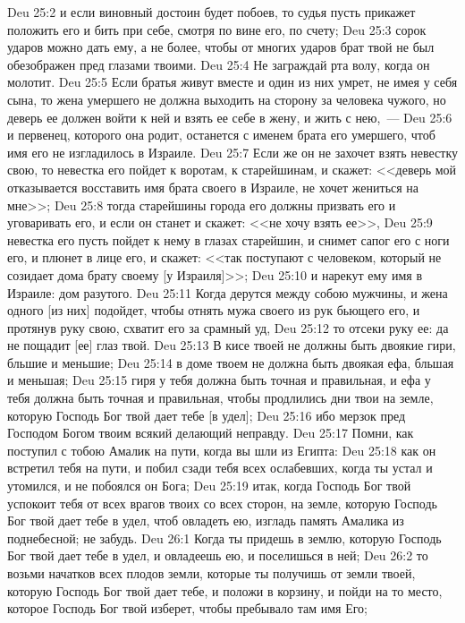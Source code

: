 \vs Deu 25:2 и если виновный достоин будет побоев, то судья пусть прикажет положить его и бить при себе, смотря по вине его, по счету;
\vs Deu 25:3 сорок ударов можно дать ему, а не более, чтобы от многих ударов брат твой не был обезображен пред глазами твоими.
\rsbpar\vs Deu 25:4 Не заграждай рта волу, когда он молотит.
\rsbpar\vs Deu 25:5 Если братья живут вместе и один из них умрет, не имея у себя сына, то жена умершего не должна выходить на сторону за человека чужого, но деверь ее должен войти к ней и взять ее себе в жену, и жить с нею,~---
\vs Deu 25:6 и первенец, которого она родит, останется с именем брата его умершего, чтоб имя его не изгладилось в Израиле.
\vs Deu 25:7 Если же он не захочет взять невестку свою, то невестка его пойдет к воротам, к старейшинам, и скажет: <<деверь мой отказывается восставить имя брата своего в Израиле, не хочет жениться на мне>>;
\vs Deu 25:8 тогда старейшины города его должны призвать его и уговаривать его, и если он станет и скажет: <<не хочу взять ее>>,
\vs Deu 25:9  невестка его пусть пойдет к нему в глазах старейшин, и снимет сапог его с ноги его, и плюнет в лице его, и скажет: <<так поступают с человеком, который не созидает дома брату своему [у Израиля]>>;
\vs Deu 25:10 и нарекут ему имя в Израиле: дом разутого.
\rsbpar\vs Deu 25:11 Когда дерутся между собою мужчины, и жена одного [из них] подойдет, чтобы отнять мужа своего из рук бьющего его, и протянув руку свою, схватит его за срамный уд,
\vs Deu 25:12 то отсеки руку ее: да не пощадит [ее] глаз твой.
\rsbpar\vs Deu 25:13 В кисе твоей не должны быть двоякие гири, бльшие и меньшие;
\vs Deu 25:14 в доме твоем не должна быть двоякая ефа, бльшая и меньшая;
\vs Deu 25:15 гиря у тебя должна быть точная и правильная, и ефа у тебя должна быть точная и правильная, чтобы продлились дни твои на земле, которую Господь Бог твой дает тебе [в удел];
\vs Deu 25:16 ибо мерзок пред Господом Богом твоим всякий делающий неправду.
\vs Deu 25:17 Помни, как поступил с тобою Амалик на пути, когда вы шли из Египта:
\vs Deu 25:18 как он встретил тебя на пути, и побил сзади тебя всех ослабевших, когда ты устал и утомился, и не побоялся он Бога;
\vs Deu 25:19 итак, когда Господь Бог твой успокоит тебя от всех врагов твоих со всех сторон, на земле, которую Господь Бог твой дает тебе в удел, чтоб овладеть ею, изгладь память Амалика из поднебесной; не забудь.
\vs Deu 26:1 Когда ты придешь в землю, которую Господь Бог твой дает тебе в удел, и овладеешь ею, и поселишься в ней;
\vs Deu 26:2 то возьми начатков всех плодов земли, которые ты получишь от земли твоей, которую Господь Бог твой дает тебе, и положи в корзину, и пойди на то место, которое Господь Бог твой изберет, чтобы пребывало там имя Его;
